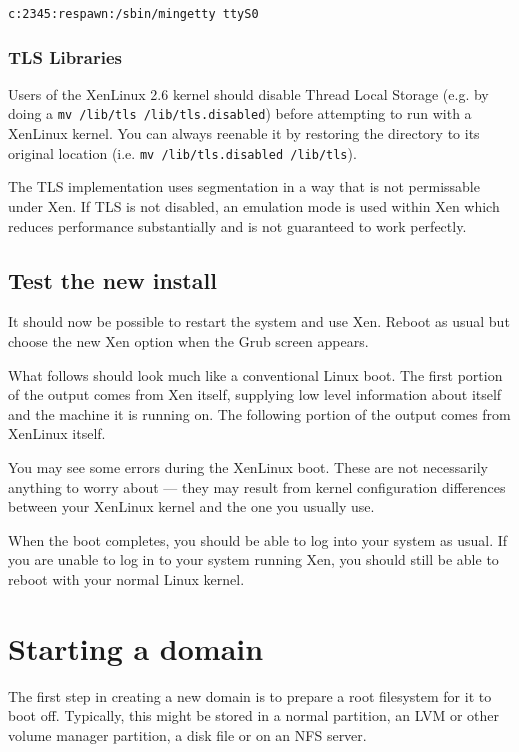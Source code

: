 \documentclass[11pt,twoside,final,openright]{xenstyle}
\begin{document}
{\tt c:2345:respawn:/sbin/mingetty ttyS0}

\subsection{TLS Libraries}

Users of the XenLinux 2.6 kernel should disable Thread Local Storage
(e.g. by doing a {\tt mv /lib/tls /lib/tls.disabled}) before
attempting to run with a XenLinux kernel.  You can always reenable it
by restoring the directory to its original location (i.e. {\tt mv
  /lib/tls.disabled /lib/tls}).

The TLS implementation uses segmentation in a way that is not
permissable under Xen.  If TLS is not disabled, an emulation mode is
used within Xen which reduces performance substantially and is not
guaranteed to work perfectly.

\section{Test the new install}

It should now be possible to restart the system and use Xen.  Reboot
as usual but choose the new Xen option when the Grub screen appears.

What follows should look much like a conventional Linux boot.  The
first portion of the output comes from Xen itself, supplying low level
information about itself and the machine it is running on.  The
following portion of the output comes from XenLinux itself.

You may see some errors during the XenLinux boot.  These are not
necessarily anything to worry about --- they may result from kernel
configuration differences between your XenLinux kernel and the one you
usually use.

When the boot completes, you should be able to log into your system as
usual.  If you are unable to log in to your system running Xen, you
should still be able to reboot with your normal Linux kernel.


\chapter{Starting a domain}

The first step in creating a new domain is to prepare a root
filesystem for it to boot off.  Typically, this might be stored in a
normal partition, an LVM or other volume manager partition, a disk
file or on an NFS server.
\end{document}
